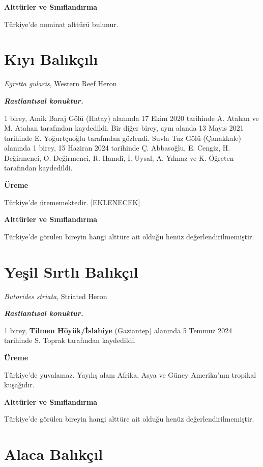 \documentclass[
  a4paper,
  DIV=11,
  numbers=noendperiod]{scrreprt}
\begin{document}
\textbf{Alttürler ve Sınıflandırma}

Türkiye'de nominat alttürü bulunur.

\section{Kıyı Balıkçılı}\label{kux131yux131-balux131kuxe7ux131lux131}

\emph{Egretta gularis}, Western Reef Heron

\textbf{\emph{Rastlantısal konuktur.}}

1 birey, Amik Baraj Gölü (Hatay) alanında 17 Ekim 2020 tarihinde A.
Atahan ve M. Atahan tarafından kaydedildi. Bir diğer birey, aynı alanda
13 Mayıs 2021 tarihinde E. Yoğurtçuoğlu tarafından gözlendi. Suvla Tuz
Gölü (Çanakkale) alanında 1 birey, 15 Haziran 2024 tarihinde Ç.
Abbasoğlu, E. Cengiz, H. Değirmenci, O. Değirmenci, R. Hamdi, İ. Uysal,
A. Yılmaz ve K. Öğreten tarafından kaydedildi.

\textbf{Üreme}

Türkiye'de ürememektedir. {[}EKLENECEK{]}

\textbf{Alttürler ve Sınıflandırma}

Türkiye'de görülen bireyin hangi alttüre ait olduğu henüz
değerlendirilmemiştir.

\section{Yeşil Sırtlı
Balıkçıl}\label{yeux15fil-sux131rtlux131-balux131kuxe7ux131l}

\emph{Butorides striata}, Striated Heron

\textbf{\emph{Rastlantısal konuktur.}}

1 birey, \textbf{Tilmen Höyük/İslahiye} (Gaziantep) alanında 5 Temmuz
2024 tarihinde S. Toprak tarafından kaydedildi.

\textbf{Üreme}

Türkiye'de yuvalamaz. Yayılış alanı Afrika, Asya ve Güney Amerika'nın
tropikal kuşağıdır.

\textbf{Alttürler ve Sınıflandırma}

Türkiye'de görülen bireyin hangi alttüre ait olduğu henüz
değerlendirilmemiştir.

\section{Alaca Balıkçıl}\label{alaca-balux131kuxe7ux131l}
\end{document}
